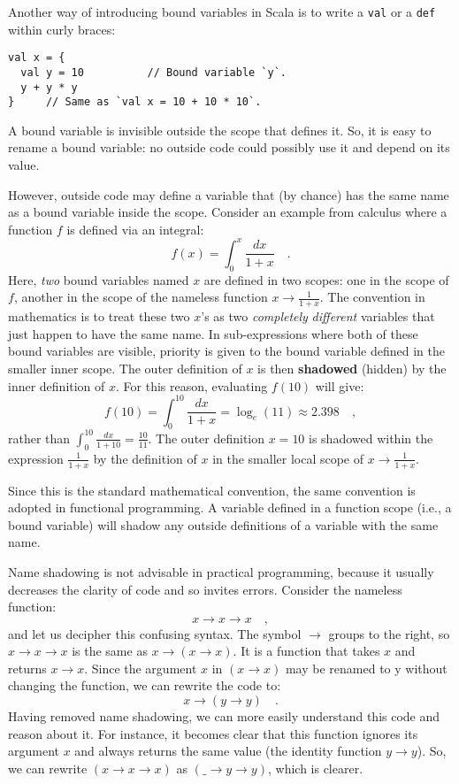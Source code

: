 Another way of introducing bound variables in Scala is to write a
\lstinline!val! or a \lstinline!def! within curly braces:
\begin{lstlisting}
val x = {
  val y = 10          // Bound variable `y`.
  y + y * y
}     // Same as `val x = 10 + 10 * 10`.
\end{lstlisting}

A bound variable is invisible outside the scope that defines it. So,
it is easy to rename a bound variable: no outside code could possibly
use it and depend on its value.

However, outside code may define a variable that (by chance) has the
same name as a bound variable inside the scope. Consider an example
from calculus where a function $f$ is defined via an integral:
\[
f(x)=\int_{0}^{x}\frac{dx}{1+x}\quad.
\]
Here, \emph{two} bound variables named $x$ are defined in two scopes:
one in the scope of $f$, another in the scope of the nameless function
$x\rightarrow\frac{1}{1+x}$. The convention in mathematics is to
treat these two $x$\textsf{'}s as two \emph{completely} \emph{different} variables
that just happen to have the same name. In sub-expressions where both
of these bound variables are visible, priority is given to the bound
variable defined in the smaller inner scope. The outer definition
of $x$ is then \textbf{shadowed} (hidden) by
the inner definition of $x$. For this reason, evaluating $f(10)$
will give:
\[
f(10)=\int_{0}^{10}\frac{dx}{1+x}=\log_{e}(11)\approx2.398\quad,
\]
rather than $\int_{0}^{10}\frac{dx}{1+10}=\frac{10}{11}$. The outer
definition $x=10$ is shadowed within the expression $\frac{1}{1+x}$
by the definition of $x$ in the smaller local scope of $x\rightarrow\frac{1}{1+x}$.

Since this is the standard mathematical convention, the same convention
is adopted in functional programming. A variable defined in a function
scope (i.e., a bound variable) will shadow any outside definitions
of a variable with the same name.

Name shadowing is not advisable in practical programming, because
it usually decreases the clarity of code and so invites errors. Consider
the nameless function:
\[
x\rightarrow x\rightarrow x\quad,
\]
and let us decipher this confusing syntax. The symbol $\rightarrow$
groups to the right, so $x\rightarrow x\rightarrow x$ is the same
as $x\rightarrow\left(x\rightarrow x\right)$. It is a function that
takes $x$ and returns $x\rightarrow x$. Since the argument $x$
in $\left(x\rightarrow x\right)$ may be renamed to y without changing
the function, we can rewrite the code to:
\[
x\rightarrow\left(y\rightarrow y\right)\quad.
\]
Having removed name shadowing, we can more easily understand this
code and reason about it. For instance, it becomes clear that this
function ignores its argument $x$ and always returns the same value
(the identity function $y\rightarrow y$). So, we can rewrite $\left(x\rightarrow x\rightarrow x\right)$
as $\left(\_\rightarrow y\rightarrow y\right)$, which is clearer.


